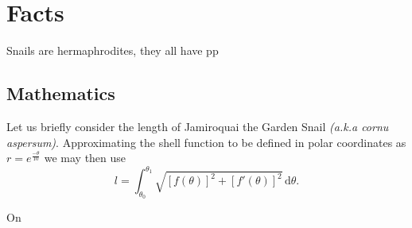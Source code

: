 \documentclass[twoside]{article}
\begin{document}
\begin{multicols}{2}

    \begin{minipage}{0.4\textwidth}
    \section*{Facts}
        Snails are hermaphrodites, they all have pp
    \end{minipage}

    \begin{flushleft}
    \begin{minipage}{0.5\textwidth}
    \section*{Mathematics}

        Let us briefly consider the length of Jamiroquai the Garden Snail \emph{(a.k.a cornu aspersum)}.
        Approximating the shell function to be defined in polar coordinates as \(r = e^{\frac{-\theta}{10}}\) we may then use \[ l = \int^{\theta_1}_{\theta_0} \sqrt{[f(\theta)]^2 + [f'(\theta)]^2} \, \mathrm{d}\theta .\]

        On

        \begin{center}
        \end{center}


\end{minipage}
\end{flushleft}
\end{multicols}
\end{document}

